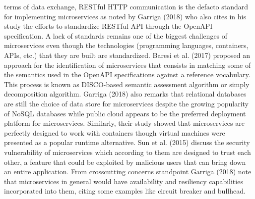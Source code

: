\documentclass{article}
\begin{document}
terms of data exchange, RESTful HTTP communication is the defacto standard for implementing microservices as noted by Garriga (2018) who also cites in his study the efforts to standardize RESTful API through the OpenAPI specification. A lack of standards remains one of the biggest challenges of microservices even though the technologies (programming languages, containers, APIs, etc.) that they are built are standardized. Baresi et al. (2017) proposed an approach for the identification of microservices that consists in matching some of the semantics used in the OpenAPI specifications against a reference vocabulary. This process is known as DISCO-based semantic assessment algorithm or simply decomposition algorithm. Garriga (2018) also remarks that relational databases are still the choice of data store for microservices despite the growing popularity of NoSQL databases while public cloud appears to be the preferred deployment platform for microservices. Similarly, their study showed that microservices are perfectly designed to work with containers though virtual machines were presented as a popular runtime alternative. Sun et al. (2015) discuss the security vulnerability of microservices which according to them are designed to trust each other, a feature that could be exploited by malicious users that can bring down an entire application. From crosscutting concerns standpoint Garriga (2018) note that microservices in general would have availability and resiliency capabilities incorporated into them, citing some examples like circuit breaker and bullhead. 
\end{document}
